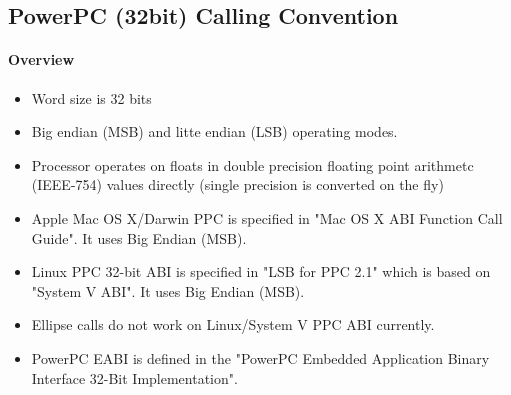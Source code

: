 %
%
%
%

\subsection{PowerPC (32bit) Calling Convention}

\paragraph{Overview}

\begin{itemize}
\item Word size is 32 bits
\item Big endian (MSB) and litte endian (LSB) operating modes.
\item Processor operates on floats in double precision floating point arithmetc (IEEE-754) values directly (single precision is converted on the fly)
\item Apple Mac OS X/Darwin PPC is specified in "Mac OS X ABI Function Call Guide". It uses Big Endian (MSB).
\item Linux PPC 32-bit ABI is specified in "LSB for PPC 2.1" which is based on "System V ABI". It uses Big Endian (MSB).
\item Ellipse calls do not work on Linux/System V PPC ABI currently.
\item PowerPC EABI is defined in the "PowerPC Embedded Application Binary Interface 32-Bit Implementation".
\end{itemize}


